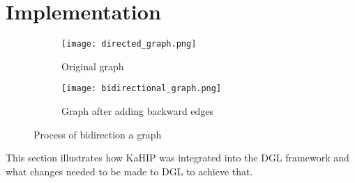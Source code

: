 \documentclass[acmsmall,nonacm,screen,review]{acmart}
\begin{document}
\section{Implementation}
\begin{figure}[b]
     \centering
     \begin{subfigure}[b]{0.45\textwidth}
         \centering
         \texttt{[image: directed\_graph.png]}
         \caption{Original graph}
         \label{uni}
     \end{subfigure}
     \hfill
     \begin{subfigure}[b]{0.45\textwidth}
         \centering
         \texttt{[image: bidirectional\_graph.png]}
         \caption{Graph after adding backward edges}
         \label{bi}
     \end{subfigure}
     \caption{Process of bidirection a graph}
     \label{bidirecting}
\end{figure}
This section illustrates how KaHIP was integrated into the DGL framework and what changes needed to be made to DGL to achieve that.
\end{document}
